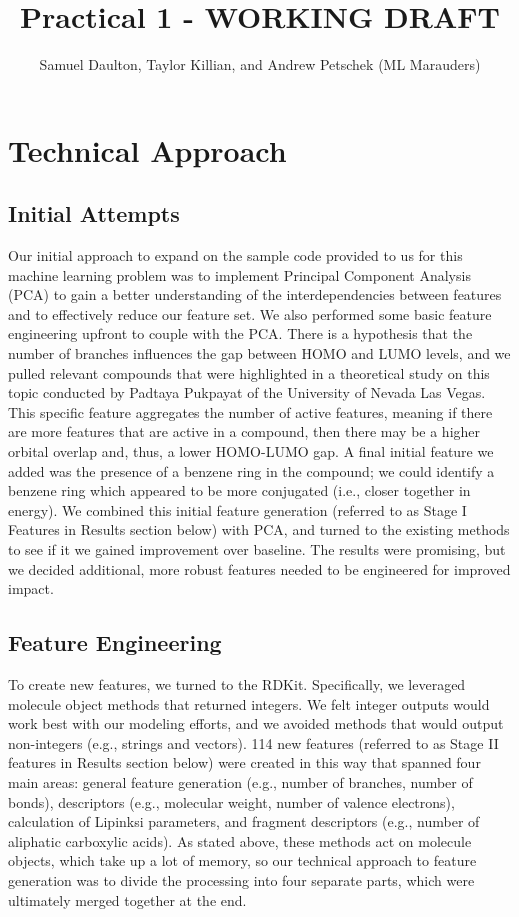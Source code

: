 \documentclass[11pt, oneside]{article}   	%
\title{Practical 1 - WORKING DRAFT}
\author{Samuel Daulton, Taylor Killian, and Andrew Petschek (ML Marauders)}
\begin{document}
\maketitle
\section{Technical Approach}
\subsection{Initial Attempts} 


Our initial approach to expand on the sample code provided to us for this machine learning problem was to implement Principal Component Analysis (PCA) to gain a better understanding of the interdependencies between features and to effectively reduce our feature set. We also performed some basic feature engineering upfront to couple with the PCA. There is a hypothesis that the number of branches influences the gap between HOMO and LUMO levels, and we pulled relevant compounds that were highlighted in a theoretical study on this topic conducted by Padtaya Pukpayat of the University of Nevada Las Vegas. This specific feature aggregates the number of active features, meaning if there are more features that are active in a compound, then there may be a higher orbital overlap and, thus, a lower HOMO-LUMO gap. A final initial feature we added was the presence of a benzene ring in the compound; we could identify a benzene ring which appeared to be more conjugated (i.e., closer together in energy). We combined this initial feature generation (referred to as Stage I Features in Results section below) with PCA, and turned to the existing methods to see if it we gained improvement over baseline. The results were promising, but we decided additional, more robust features needed to be engineered for improved impact. 

\subsection{Feature Engineering} 

To create new features, we turned to the RDKit. Specifically, we leveraged molecule object methods that returned integers. We felt integer outputs would work best with our modeling efforts, and we avoided methods that would output non-integers (e.g., strings and vectors). 114 new features (referred to as Stage II features in Results section below) were created in this way that spanned four main areas: general feature generation (e.g., number of branches, number of bonds), descriptors (e.g., molecular weight, number of valence electrons), calculation of Lipinksi parameters, and fragment descriptors (e.g., number of aliphatic carboxylic acids). As stated above, these methods act on molecule objects, which take up a lot of memory, so our technical approach to feature generation was to divide the processing into four separate parts, which were ultimately merged together at the end. 
\end{document}
